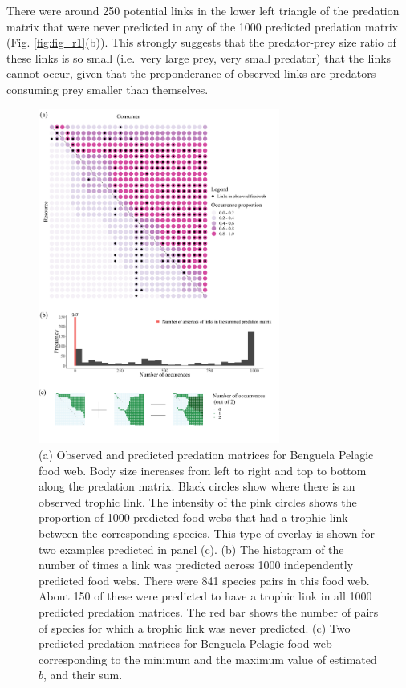 \documentclass{article}
\begin{document}
There were around 250 potential links in the lower left triangle of the
predation matrix that were never predicted in any of the 1000 predicted
predation matrix (Fig. \ref{fig:fig_r1}(b)). This strongly suggests that
the predator-prey size ratio of these links is so small (i.e.~very large
prey, very small predator) that the links cannot occur, given that the
preponderance of observed links are predators consuming prey smaller
than themselves.

\begin{figure}

{\centering \includegraphics[width=300px]{fig/Benguela_Pelagic_pred_mat} 

}

\caption{\label{fig:fig_r1} (a) Observed and predicted predation matrices for Benguela Pelagic food web. Body size increases from left to right and top to bottom along the predation matrix. Black circles show where there is an observed trophic link. The intensity of the pink circles shows the proportion of 1000 predicted food webs that had a trophic link between the corresponding species. This type of overlay is shown for two examples predicted in panel (c). (b) The histogram of the number of times a link was predicted across 1000 independently predicted food webs. There were 841 species pairs in this food web. About 150 of these were predicted to have a trophic link in all 1000 predicted predation matrices. The red bar shows the number of pairs of species for which a trophic link was never predicted. (c) Two predicted predation matrices for Benguela Pelagic food web corresponding to the minimum and the maximum value of estimated $b$, and their sum.}\label{fig:unnamed-chunk-5}
\end{figure}
\end{document}
